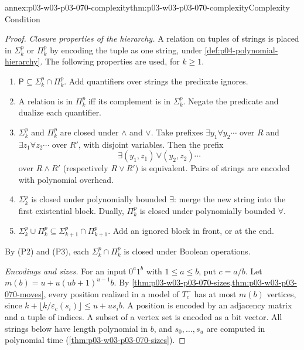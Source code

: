 \begin{annexitem}{annex:p03-w03-p03-070-complexity}{thm:p03-w03-p03-070-complexity}{Complexity Condition}
\begin{proof}
\emph{Closure properties of the hierarchy.}  A relation on tuples of strings
is placed in \(\Sigma^p_k\) or \(\Pi^p_k\) by encoding the tuple as one string,
under \cref{def:p04-polynomial-hierarchy}.  The following properties are used,
for \(k\geq1\).
\begin{enumerate}
\item[(P1)] \(\mathsf P\subseteq\Sigma^p_k\cap\Pi^p_k\).  Add quantifiers over
      strings the predicate ignores.
\item[(P2)] A relation is in \(\Pi^p_k\) iff its complement is in
      \(\Sigma^p_k\).  Negate the predicate and dualize each quantifier.
\item[(P3)] \(\Sigma^p_k\) and \(\Pi^p_k\) are closed under \(\wedge\) and
      \(\vee\).  Take prefixes \(\exists y_1\forall y_2\cdots\) over \(R\)
      and \(\exists z_1\forall z_2\cdots\) over \(R'\), with disjoint
      variables.  Then the prefix
      \[
       \exists(y_1,z_1)\,\forall(y_2,z_2)\cdots
      \]
      over \(R\wedge R'\) (respectively \(R\vee R'\)) is equivalent.  Pairs of
      strings are encoded with polynomial overhead.
\item[(P4)] \(\Sigma^p_k\) is closed under polynomially bounded \(\exists\):
      merge the new string into the first existential block.  Dually,
      \(\Pi^p_k\) is closed under polynomially bounded \(\forall\).
\item[(P5)] \(\Sigma^p_k\cup\Pi^p_k\subseteq\Sigma^p_{k+1}\cap\Pi^p_{k+1}\).  Add an ignored
      block in front, or at the end.
\end{enumerate}
By (P2) and (P3), each \(\Sigma^p_k\cap\Pi^p_k\) is closed under Boolean operations.

\emph{Encodings and sizes.}  For an input \(0^a1^b\) with \(1\leq a\leq b\), put
\(c=a/b\).  Let \(m(b)=u+u(ub+1)^{u-1}b\).  By
\cref{thm:p03-w03-p03-070-sizes,thm:p03-w03-p03-070-moves}, every position
realized in a model of \(T^-_c\) has at most \(m(b)\) vertices, since
\(k+\lfloor k/\varepsilon_c(s_i)\rfloor\leq u+us_ib\).  A position is encoded
by an adjacency matrix and a tuple of indices.  A subset of a vertex set is
encoded as a bit vector.  All strings below have length polynomial in \(b\),
and \(s_0,\ldots,s_u\) are computed in polynomial time
(\cref{thm:p03-w03-p03-070-sizes}).


\end{proof}
\end{annexitem}
